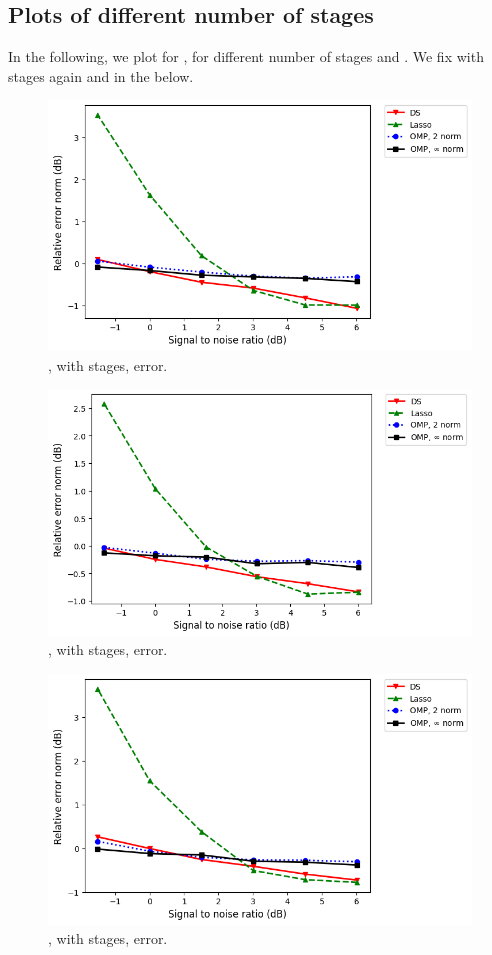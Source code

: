 \subsection {Plots of different number of stages}

In the following, we plot for , for different number of stages  and .
We fix  with  stages again and in the below.
%
\begin {figure} [H]
\includegraphics [width = 0.8 \textwidth] {error-medium-more-square-three-usual.png}
\caption {, with  stages, error.}
\end {figure}
%
\begin {figure} [H]
\includegraphics [width = 0.8 \textwidth] {error-medium-more-wide-three-usual.png}
\caption {, with  stages, error.}
\end {figure}
%
\begin {figure} [H]
\includegraphics [width = 0.8 \textwidth] {error-medium-more-tall-three-usual.png}
\caption {, with  stages, error.}
\end {figure}
